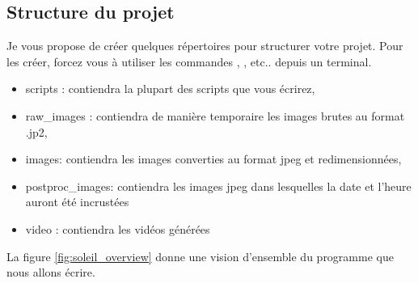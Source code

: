 \subsection{Structure du projet}

Je vous propose de créer quelques répertoires pour structurer votre projet. Pour les créer, forcez vous à utiliser les commandes \mkdir, \ls, etc.. depuis un terminal.
\begin{itemize}
\item scripts : contiendra la plupart des scripts que vous écrirez,
\item raw\_images : contiendra de manière temporaire les images brutes au format .jp2,
\item images: contiendra les images converties au format jpeg et redimensionnées,
\item postproc\_images: contiendra les images jpeg dans lesquelles la date et l'heure auront été incrustées
\item video : contiendra les vidéos générées
\end{itemize}

La figure \ref{fig:soleil_overview} donne une vision d'ensemble du programme que nous allons écrire.

